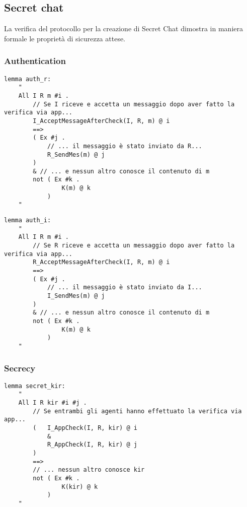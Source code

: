 \subsection{Secret chat}
La verifica del protocollo per la creazione di Secret Chat dimostra in maniera formale le proprietà di sicurezza attese.

\subsubsection{Authentication}

\begin{lstlisting}[caption={Se entrambi gli utenti hanno confermato tramite l'applicazione di 
    vedere la stessa chiave, allora il primo ha effettivamente ricevuto un messaggio dal secondo.},
    label=cod:lemma:auth_r]
lemma auth_r:
    "
    All I R m #i .
        // Se I riceve e accetta un messaggio dopo aver fatto la verifica via app...
        I_AcceptMessageAfterCheck(I, R, m) @ i
        ==>
        ( Ex #j . 
            // ... il messaggio è stato inviato da R...
            R_SendMes(m) @ j
        )
        & // ... e nessun altro conosce il contenuto di m
        not ( Ex #k . 
                K(m) @ k 
            ) 
    "
\end{lstlisting}

\begin{lstlisting}[caption={Se entrambi gli utenti hanno confermato tramite l'applicazione di 
    vedere la stessa chiave, allora il secondo ha effettivamente ricevuto un messaggio dal primo.},
    label=cod:lemma:auth_i]
lemma auth_i:
    "
    All I R m #i .
        // Se R riceve e accetta un messaggio dopo aver fatto la verifica via app...
        R_AcceptMessageAfterCheck(I, R, m) @ i
        ==>
        ( Ex #j . 
            // ... il messaggio è stato inviato da I...
            I_SendMes(m) @ j
        )
        & // ... e nessun altro conosce il contenuto di m
        not ( Ex #k . 
                K(m) @ k 
            ) 
    "
\end{lstlisting}

\subsubsection{Secrecy}

\begin{lstlisting}[caption={Se entrambi gli utenti hanno confermato tramite l'applicazione di 
    vedere la stessa chiave, allora questa è nota solo a loro.},
    label=cod:lemma:secret_kir]
lemma secret_kir:
    "
    All I R kir #i #j .
        // Se entrambi gli agenti hanno effettuato la verifica via app...
        (   I_AppCheck(I, R, kir) @ i
            &
            R_AppCheck(I, R, kir) @ j
        )
        ==>
        // ... nessun altro conosce kir
        not ( Ex #k . 
                K(kir) @ k 
            )
    "
\end{lstlisting}

